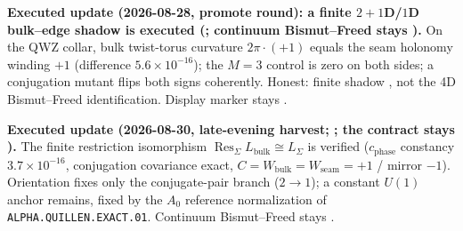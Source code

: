 \documentclass[11pt,a4paper]{article}
\begin{document}
\par\smallskip\noindent\textbf{Executed update (2026-08-28, promote round): a finite $2{+}1$D/$1$D
bulk--edge shadow is executed
(; continuum
Bismut--Freed stays \mO).}
On the QWZ collar, bulk twist-torus curvature $2\pi\cdot(+1)$ equals the seam holonomy winding
$+1$ (difference $5.6\times10^{-16}$); the $M=3$ control is zero on both sides; a conjugation
mutant flips both signs coherently.  Honest: finite shadow \mE, not the 4D Bismut--Freed
identification.  Display marker stays \mO.

\par\smallskip\noindent\textbf{Executed update (2026-08-30, late-evening harvest;
; the contract stays \mO).}
The finite restriction isomorphism $\operatorname{Res}_\Sigma L_{\mathrm{bulk}}\cong L_\Sigma$
is verified ($c_{\mathrm{phase}}$ constancy $3.7{\times}10^{-16}$, conjugation covariance exact,
$C=W_{\mathrm{bulk}}=W_{\mathrm{seam}}=+1$ / mirror $-1$).  Orientation fixes only the
conjugate-pair branch ($2\to1$); a constant $U(1)$ anchor remains, fixed by the $A_0$
reference normalization of \texttt{ALPHA.QUILLEN.EXACT.01}.  Continuum Bismut--Freed stays \mO.

\end{document}
